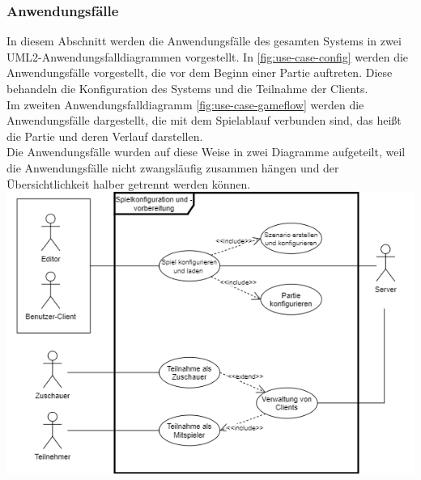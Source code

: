 \documentclass{uulm-assignment}
\newcounter{fa}
\begin{document}
\subsubsection{Anwendungsfälle}
\label{sssec:use-cases}

In diesem Abschnitt werden die Anwendungsfälle des gesamten Systems in zwei UML2-Anwendungsfalldiagrammen vorgestellt. In \autoref{fig:use-case-config} werden die Anwendungsfälle vorgestellt, die vor dem Beginn einer Partie auftreten. Diese behandeln die Konfiguration des Systems und die Teilnahme der Clients. \\ Im zweiten Anwendungsfalldiagramm \autoref{fig:use-case-gameflow} werden die Anwendungsfälle dargestellt, die mit dem Spielablauf verbunden sind, das heißt die Partie und deren Verlauf darstellen. \\ Die Anwendungsfälle wurden auf diese Weise in zwei Diagramme aufgeteilt, weil die Anwendungsfälle nicht zwangsläufig zusammen hängen und der Übersichtlichkeit halber getrennt werden können. \\ 

\centering
\includegraphics[width=\textwidth]{images/Anwendungsfalldiagramm_Konfiguration}
\label{fig:use-case-config}
\flushleft

\vspace{2cm}
\end{document}
